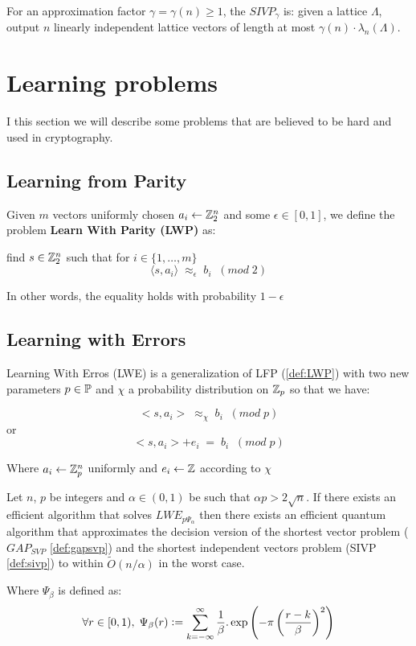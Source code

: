 \documentclass[Ingles]{ic-tese-v3}
\begin{document}
\begin{definition}
  \label{def:sivp}
  For an approximation factor $\gamma = \gamma(n) \geq 1$, the $SIVP_\gamma$ is: given a lattice $\Lambda$, output $n$ linearly independent lattice vectors of length at most $\gamma(n) \cdot \lambda_n(\Lambda)$.
\end{definition}

\section{Learning problems}
\label{sec:org99d4656}
I this section we will describe some problems that are believed to be hard and used in cryptography. 
\subsection{Learning from Parity}
\label{sec:orgbb83f1f}
 \begin{definition}
  \label{def:LWP}
  Given $m$ vectors uniformly chosen  $a_i \gets \Z^n_2$ and some $\epsilon \in [0,1]$, we
  define the problem \textbf{Learn With Parity (LWP)} as:

  find $s \in \Z^n_2$ such that for $i \in \{1,\dots,m\}$
     $$ \langle{s, a_i}\rangle \; \approx_\epsilon \; b_i \;\; (mod\; 2) $$

     In other words, the equality holds with probability $1 - \epsilon$

\end{definition}

\subsection{Learning with Errors}
\label{sec:org9941e25}
\begin{definition}
  \label{def:LWE}
  Learning With Erros (LWE) is a generalization of LFP (\ref{def:LWP}) with two new parameters $p \in \P$ and $\chi$ a probability distribution on $\Z_p$ so that we have:

     $$ <s, a_i> \; \approx_\chi \; b_i \;\; (mod\; p) $$
     or
     $$ <s, a_i> + e_i \; = \;  b_i \;\; (mod\; p) $$

     Where $a_i \gets \Z^n_p$ uniformly and $e_i \gets \Z$ according to $\chi$

\end{definition}

\begin{theorem}
  Let $n$, $p$ be integers and $\alpha \in (0, 1)$ be such that $\alpha p > 2\sqrt{n}$. If
  there exists an efficient algorithm that solves $LWE_{p \Psi_\alpha}$ then there
  exists an efficient quantum algorithm that approximates the decision version
  of the shortest vector problem ($GAP_{SVP}$ \ref{def:gapsvp}) and the
  shortest independent vectors problem (SIVP \ref{def:sivp}) to within
  $\tilde{O}(n/\alpha)$ in the worst case.

  Where $\Psi_\beta$ is defined as:
  $$
  \forall r \in [0,1), \; \Psi_\beta(r) \defsym \sum_{k=-\infty}^\infty{\frac{1}{\beta} . \exp{\left( -\pi \left( \frac{r-k}{\beta} \right)^2 \right)}}
  $$
\end{theorem}
\end{document}
